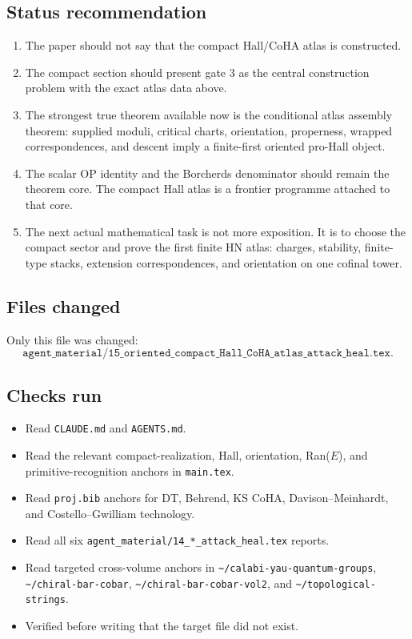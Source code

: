 \subsection{Status recommendation}

\begin{enumerate}
\item The paper should not say that the compact Hall/CoHA atlas is
constructed.
\item The compact section should present gate 3 as the central
construction problem with the exact atlas data above.
\item The strongest true theorem available now is the conditional atlas
assembly theorem: supplied moduli, critical charts, orientation,
properness, wrapped correspondences, and descent imply a finite-first
oriented pro-Hall object.
\item The scalar OP identity and the Borcherds denominator should remain
the theorem core.  The compact Hall atlas is a frontier programme
attached to that core.
\item The next actual mathematical task is not more exposition.  It is
to choose the compact sector and prove the first finite HN atlas:
charges, stability, finite-type stacks, extension correspondences, and
orientation on one cofinal tower.
\end{enumerate}

\subsection{Files changed}

Only this file was changed:
\[
\texttt{agent\_material/15\_oriented\_compact\_Hall\_CoHA\_atlas\_attack\_heal.tex}.
\]

\subsection{Checks run}

\begin{itemize}
\item Read \verb|CLAUDE.md| and \verb|AGENTS.md|.
\item Read the relevant compact-realization, Hall, orientation,
Ran(\(E\)), and primitive-recognition anchors in \verb|main.tex|.
\item Read \verb|proj.bib| anchors for DT, Behrend, KS CoHA,
Davison--Meinhardt, and Costello--Gwilliam technology.
\item Read all six \verb|agent_material/14_*_attack_heal.tex| reports.
\item Read targeted cross-volume anchors in
\verb|~/calabi-yau-quantum-groups|,
\verb|~/chiral-bar-cobar|,
\verb|~/chiral-bar-cobar-vol2|, and
\verb|~/topological-strings|.
\item Verified before writing that the target file did not exist.
\end{itemize}

